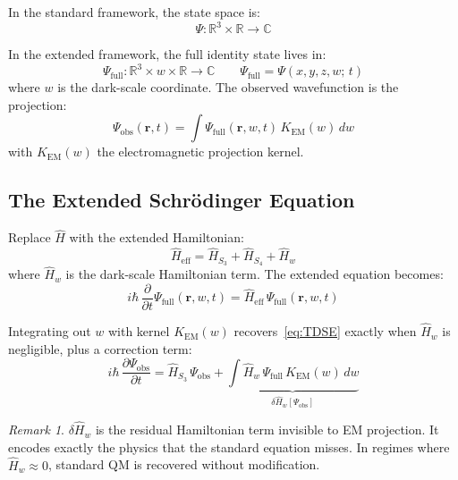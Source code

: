 \documentclass[11pt, a4paper, oneside]{article}
\theoremstyle{definition}
\theoremstyle{plain}
\theoremstyle{remark}
\newtheorem{remark}{Remark}[section]
\begin{document}
In the standard framework, the state space is:
\begin{equation}
  \Psi: \mathbb{R}^3 \times \mathbb{R} \to \mathbb{C}
\end{equation}

In the extended framework, the full identity state lives in:
\begin{equation}
  \Psi_\text{full}: \mathbb{R}^3 \times w \times \mathbb{R} \to \mathbb{C}
  \qquad
  \Psi_\text{full} = \Psi(x, y, z, w;\, t)
  \label{eq:extended-state}
\end{equation}
where $w$ is the dark-scale coordinate. The observed wavefunction is the
projection:
\begin{equation}
  \Psi_\text{obs}(\mathbf{r}, t)
  = \int \Psi_\text{full}(\mathbf{r}, w, t)\, K_\text{EM}(w)\, dw
  \label{eq:projected-wavefunction}
\end{equation}
with $K_\text{EM}(w)$ the electromagnetic projection kernel.

\subsection{The Extended Schr\"{o}dinger Equation}

Replace $\hat{H}$ with the extended Hamiltonian:
\begin{equation}
  \hat{H}_\text{eff} = \hat{H}_{S_3} + \hat{H}_{S_4} + \hat{H}_w
  \label{eq:extended-H}
\end{equation}
where $\hat{H}_w$ is the dark-scale Hamiltonian term. The extended equation
becomes:
\begin{equation}
  \boxed{
	i\hbar\,\frac{\partial}{\partial t}\Psi_\text{full}(\mathbf{r}, w, t)
	= \hat{H}_\text{eff}\,\Psi_\text{full}(\mathbf{r}, w, t)
  }
  \label{eq:extended-TDSE}
\end{equation}

Integrating out $w$ with kernel $K_\text{EM}(w)$ recovers~\eqref{eq:TDSE}
exactly when $\hat{H}_w$ is negligible, plus a correction term:
\begin{equation}
  i\hbar\,\frac{\partial \Psi_\text{obs}}{\partial t}
  = \hat{H}_{S_3}\,\Psi_\text{obs}
  + \underbrace{\int \hat{H}_w\,\Psi_\text{full}\, K_\text{EM}(w)\, dw}
			   _{\displaystyle\delta\hat{H}_w[\Psi_\text{obs}]}
  \label{eq:corrected-TDSE}
\end{equation}

\begin{remark}
  $\delta\hat{H}_w$ is the residual Hamiltonian term invisible to EM
  projection. It encodes exactly the physics that the standard equation
  misses. In regimes where $\hat{H}_w \approx 0$, standard QM is
  recovered without modification.
\end{remark}
\end{document}
